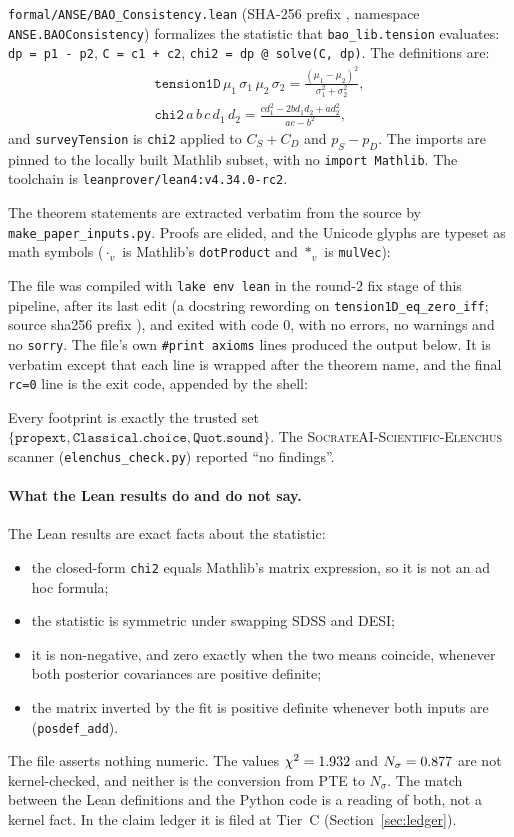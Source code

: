 \documentclass[11pt]{article}
\begin{document}
\texttt{formal/ANSE/BAO\_Consistency.lean} (SHA-256 prefix
\texttt{\LeanSha}, namespace \texttt{ANSE.BAOConsistency}) formalizes the
statistic that \texttt{bao\_lib.tension} evaluates: \texttt{dp = p1 - p2},
\texttt{C = c1 + c2}, \texttt{chi2 = dp @ solve(C, dp)}. The definitions are:
\begin{gather*}
\texttt{tension1D}\,\mu_1\,\sigma_1\,\mu_2\,\sigma_2=\frac{(\mu_1-\mu_2)^2}{\sigma_1^2+\sigma_2^2},\\
\texttt{chi2}\,a\,b\,c\,d_1\,d_2=\frac{c d_1^2-2 b d_1 d_2+a d_2^2}{ac-b^2},
\end{gather*}
and \texttt{surveyTension} is \texttt{chi2} applied to $C_S+C_D$ and
$p_S-p_D$. The imports are pinned to the locally built Mathlib subset, with
no \texttt{import Mathlib}. The toolchain is
\texttt{leanprover/lean4:v4.34.0-rc2}.

The theorem statements are extracted verbatim from the source by
\texttt{make\_paper\_inputs.py}. Proofs are elided, and the Unicode glyphs
are typeset as math symbols ($\cdot_v$ is Mathlib's \texttt{dotProduct} and
$*_v$ is \texttt{mulVec}):


The file was compiled with \texttt{lake env lean} in the round-2 fix stage
of this pipeline, after its last edit (a docstring rewording on
\texttt{tension1D\_eq\_zero\_iff}; source sha256 prefix \LeanSha), and exited
with code 0, with no errors, no warnings and no \texttt{sorry}. The file's own \texttt{\#print axioms} lines produced the
output below. It is verbatim except that each line is wrapped after the
theorem name, and the final \texttt{rc=0} line is the exit code, appended by
the shell:


Every footprint is exactly the trusted set
$\{\texttt{propext},\texttt{Classical.choice},\texttt{Quot.sound}\}$. The
\textsc{SocrateAI-Scientific-Elenchus} scanner (\texttt{elenchus\_check.py})
reported ``no findings''.

\paragraph{What the Lean results do and do not say.} The Lean results are
exact facts about the statistic:
\begin{itemize}
\item the closed-form \texttt{chi2} equals Mathlib's matrix expression, so
  it is not an ad hoc formula;
\item the statistic is symmetric under swapping SDSS and DESI;
\item it is non-negative, and zero exactly when the two means coincide,
  whenever both posterior covariances are positive definite;
\item the matrix inverted by the fit is positive definite whenever both
  inputs are (\texttt{posdef\_add}).
\end{itemize}
The file asserts nothing numeric. The values $\chi^2=1.932$ and
$N_\sigma=0.877$ are not kernel-checked, and neither is the conversion from
PTE to $N_\sigma$. The match between the Lean definitions and the Python
code is a reading of both, not a kernel fact. In the claim ledger it is
filed at Tier~C (Section~\ref{sec:ledger}).
\end{document}
